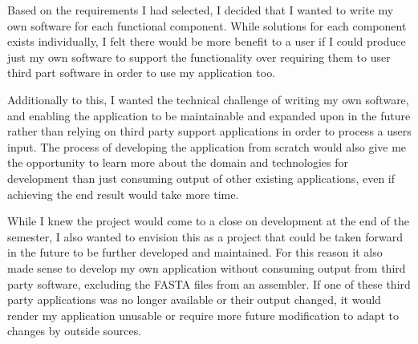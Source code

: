 Based on the requirements I had selected, I decided that I wanted to write my own software for each functional component. While solutions for each component exists individually, I felt there would be more benefit to a user if I could produce just my own software to support the functionality over requiring them to user third part software in order to use my application too.

Additionally to this, I wanted the technical challenge of writing my own software, and enabling the application to be maintainable and expanded upon in the future rather than relying on third party support applications in order to process a users input. The process of developing the application from scratch would also give me the opportunity to learn more about the domain and technologies for development than just consuming output of other existing applications, even if achieving the end result would take more time.

While I knew the project would come to a close on development at the end of the semester, I also wanted to envision this as a project that could be taken forward in the future to be further developed and maintained. For this reason it also made sense to develop my own application without consuming output from third party software, excluding the FASTA files from an assembler. If one of these third party applications was no longer available or their output changed, it would render my application unusable or require more future modification to adapt to changes by outside sources.

